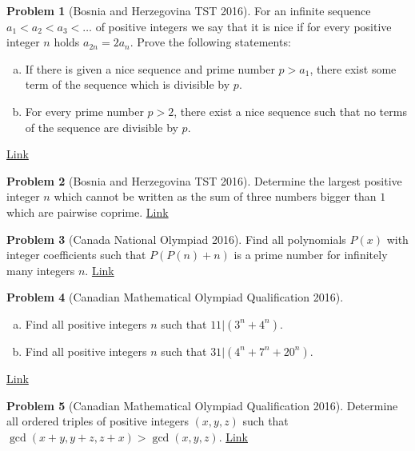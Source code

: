 \documentclass[]{article}
\theoremstyle{definition}
\newtheorem{problem}{Problem}
\begin{document}
	
\begin{problem}[Bosnia and Herzegovina TST 2016]
	For an infinite sequence $a_1<a_2<a_3< \dots$ of positive integers we say that it is nice if for every positive integer $n$ holds $a_{2n}=2a_n$. Prove the following statements:
		\begin{enumerate}[(a)]
			\item If there is given a nice sequence and prime number $p>a_1$, there exist some term of the sequence which is divisible by $p$.
			\item For every prime number $p>2$, there exist a nice sequence such that no terms of the sequence are divisible by $p$.
		\end{enumerate}
	\flushright \href{http://artofproblemsolving.com/community/c6h1243216p6360340}{Link}
\end{problem}


	
\begin{problem}[Bosnia and Herzegovina TST 2016]
	Determine the largest positive integer $n$ which cannot be written as the sum of three numbers bigger than $1$ which are pairwise coprime. \hfill \href{http://artofproblemsolving.com/community/c6h1243220p6360359}{Link}
\end{problem}


	
\begin{problem}[Canada National Olympiad 2016]
	Find all polynomials $P(x)$ with integer coefficients such that $P(P(n) + n)$ is a prime number for infinitely many integers $n$. \hfill \href{http://artofproblemsolving.com/community/c6h1225741p6160566}{Link}
\end{problem}


	
\begin{problem}[Canadian Mathematical Olympiad Qualification 2016]
	$ $
	\begin{enumerate}[(a)]
		\item Find all positive integers $n$ such that $11|(3^n + 4^n)$.
		\item Find all positive integers $n$ such that $31|(4^n + 7^n + 20^n)$.
	\end{enumerate}
	\flushright \href{http://artofproblemsolving.com/community/c6h1259325p6529513}{Link}
\end{problem}


	
\begin{problem}[Canadian Mathematical Olympiad Qualification 2016]
	Determine all ordered triples of positive integers $(x, y, z)$ such that $\gcd(x+y, y+z, z+x) > \gcd(x, y, z)$. \hfill \href{http://artofproblemsolving.com/community/c6h1259332p6529539}{Link}
\end{problem}
\end{document}
